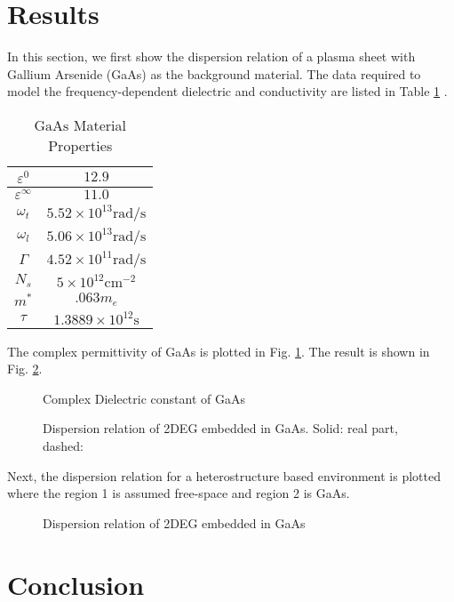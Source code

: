 \documentclass[conference, 10pt]{IEEEtran}
\renewcommand{\O}{\omega}  %
\newcommand{\E}{\varepsilon}  %
\renewcommand{\inf}{\infty}  %
\renewcommand{\^}{\hat}  %
\begin{document}
\section{Results}
%
In this section, we first show the dispersion relation of a plasma sheet with Gallium Arsenide (GaAs) as the background material. The data required to model the frequency-dependent dielectric and conductivity are listed in Table \ref{tab:data} \cite{Palik1997429}.
%
\begin{table}[!t]
\renewcommand{\arraystretch}{1.3}
\caption{$\mathrm{GaAs}$ Material Properties}
\label{table_example}
\centering
\begin{tabular}{c||c}
\hline
$\E^{0}$ & $12.9$\\ \hline
$\E^{\inf}$ & $11.0$ \\  \hline
$\O_t$ & $5.52 \times 10^{13} \mathrm{rad/s}$ \\  \hline
$\O_l$ & $5.06 \times 10^{13} \mathrm{rad/s}$ \\  \hline
$\Gamma$ &  $4.52 \times 10^{11} \mathrm{rad/s}$ \\  \hline
$N_s$ & $5 \times 10^{12} \mathrm{cm^{-2}}$ \\  \hline
$m^{\ast}$ & $.063 m_e$ \\  \hline
$\tau$ & $1.3889 \times 10^{12} \mathrm{s} $ \\  \hline
\end{tabular}
\label{tab:data}
\end{table}
%
The complex permittivity of GaAs is plotted in Fig. \ref{fig:epsilon}. The result is shown in Fig. \ref{fig:disp_homo}.
%
\begin{figure}[t!]
  \normalsize
  \centering
  
  \caption{Complex Dielectric constant of GaAs}
  \label{fig:epsilon}
\end{figure}
%
\begin{figure}[h]
  \normalsize
  \centering
  
  \caption{Dispersion relation of 2DEG embedded in GaAs. Solid: real part, dashed: }
  \label{fig:disp_homo}
\end{figure}
%

Next, the dispersion relation for a heterostructure based environment is plotted where the region 1 is assumed free-space and region 2 is GaAs.
\begin{figure}[h]
  \normalsize
  \centering
  
  \caption{Dispersion relation of 2DEG embedded in GaAs}
  \label{fig:disp_diff}
\end{figure}

\section{Conclusion}
%

%


\end{document}
